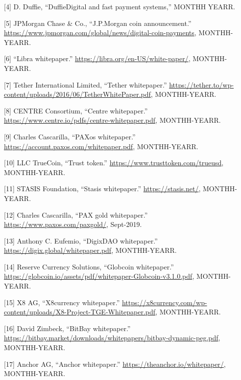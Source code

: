 \documentclass[english,]{IEEEtran}
\begin{document}
\hypertarget{ref-DuffieDigital_and_Fast_Payment_Systems}{}
{[}4{]} D. Duffie, ``DuffieDigital and fast payment systems,'' MONTHH
YEARR.

\hypertarget{ref-JPMorgan_Coin:whitepaper}{}
{[}5{]} JPMorgan Chase \& Co., ``J.P.Morgan coin announcement.''
\url{https://www.jpmorgan.com/global/news/digital-coin-payments},
MONTHH-YEARR.

\hypertarget{ref-Libra:whitepaper}{}
{[}6{]} ``Libra whitepaper.''
\url{https://libra.org/en-US/white-paper/}, MONTHH-YEARR.

\hypertarget{ref-Tether:whitepaper}{}
{[}7{]} Tether International Limited, ``Tether whitepaper.''
\url{https://tether.to/wp-content/uploads/2016/06/TetherWhitePaper.pdf},
MONTHH-YEARR.

\hypertarget{ref-Centre:whitepaper}{}
{[}8{]} CENTRE Consortium, ``Centre whitepaper.''
\url{https://www.centre.io/pdfs/centre-whitepaper.pdf}, MONTHH-YEARR.

\hypertarget{ref-PAXos:whitepaper}{}
{[}9{]} Charles Cascarilla, ``PAXos whitepaper.''
\url{https://account.paxos.com/whitepaper.pdf}, MONTHH-YEARR.

\hypertarget{ref-TrueUSD:whitepaper}{}
{[}10{]} LLC TrueCoin, ``Trust token.''
\url{https://www.trusttoken.com/trueusd}, MONTHH-YEARR.

\hypertarget{ref-Stasis:whitepaper}{}
{[}11{]} STASIS Foundation, ``Stasis whitepaper.''
\url{https://stasis.net/}, MONTHH-YEARR.

\hypertarget{ref-PAXGold:whitepaper}{}
{[}12{]} Charles Cascarilla, ``PAX gold whitepaper.''
\url{https://www.paxos.com/paxgold/}, Sept-2019.

\hypertarget{ref-DigixDAO:whitepaper}{}
{[}13{]} Anthony C. Eufemio, ``DigixDAO whitepaper.''
\url{https://digix.global/whitepaper.pdf}, MONTHH-YEARR.

\hypertarget{ref-globcoin:whitepaper}{}
{[}14{]} Reserve Currency Solutions, ``Globcoin whitepaper.''
\url{https://globcoin.io/assets/pdf/whitepaper-Globcoin-v3.1.0.pdf},
MONTHH-YEARR.

\hypertarget{ref-x8currency:whitepaper}{}
{[}15{]} X8 AG, ``X8currency whitepaper.''
\url{https://x8currency.com/wp-content/uploads/X8-Project-TGE-Whitepaper.pdf},
MONTHH-YEARR.

\hypertarget{ref-BitBay:whitepaper}{}
{[}16{]} David Zimbeck, ``BitBay whitepaper.''
\url{https://bitbay.market/downloads/whitepapers/bitbay-dynamic-peg.pdf},
MONTHH-YEARR.

\hypertarget{ref-Anchor:whitepaper}{}
{[}17{]} Anchor AG, ``Anchor whitepaper.''
\url{https://theanchor.io/whitepaper/}, MONTHH-YEARR.
\end{document}
